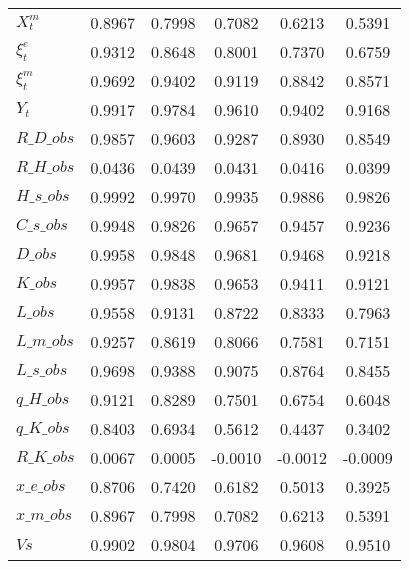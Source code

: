 \begin{center}
\begin{longtable}{lccccc}
$ X^m_t             $	 & 	    0.8967	 & 	    0.7998	 & 	    0.7082	 & 	    0.6213	 & 	    0.5391 \\ 
$ \xi^e_t           $	 & 	    0.9312	 & 	    0.8648	 & 	    0.8001	 & 	    0.7370	 & 	    0.6759 \\ 
$  \xi^m_t          $	 & 	    0.9692	 & 	    0.9402	 & 	    0.9119	 & 	    0.8842	 & 	    0.8571 \\ 
$ Y_t               $	 & 	    0.9917	 & 	    0.9784	 & 	    0.9610	 & 	    0.9402	 & 	    0.9168 \\ 
$R\_D\_obs          $	 & 	    0.9857	 & 	    0.9603	 & 	    0.9287	 & 	    0.8930	 & 	    0.8549 \\ 
$R\_H\_obs          $	 & 	    0.0436	 & 	    0.0439	 & 	    0.0431	 & 	    0.0416	 & 	    0.0399 \\ 
$H\_s\_obs          $	 & 	    0.9992	 & 	    0.9970	 & 	    0.9935	 & 	    0.9886	 & 	    0.9826 \\ 
$C\_s\_obs          $	 & 	    0.9948	 & 	    0.9826	 & 	    0.9657	 & 	    0.9457	 & 	    0.9236 \\ 
$D\_obs             $	 & 	    0.9958	 & 	    0.9848	 & 	    0.9681	 & 	    0.9468	 & 	    0.9218 \\ 
$K\_obs             $	 & 	    0.9957	 & 	    0.9838	 & 	    0.9653	 & 	    0.9411	 & 	    0.9121 \\ 
$L\_obs             $	 & 	    0.9558	 & 	    0.9131	 & 	    0.8722	 & 	    0.8333	 & 	    0.7963 \\ 
$L\_m\_obs          $	 & 	    0.9257	 & 	    0.8619	 & 	    0.8066	 & 	    0.7581	 & 	    0.7151 \\ 
$L\_s\_obs          $	 & 	    0.9698	 & 	    0.9388	 & 	    0.9075	 & 	    0.8764	 & 	    0.8455 \\ 
$q\_H\_obs          $	 & 	    0.9121	 & 	    0.8289	 & 	    0.7501	 & 	    0.6754	 & 	    0.6048 \\ 
$q\_K\_obs          $	 & 	    0.8403	 & 	    0.6934	 & 	    0.5612	 & 	    0.4437	 & 	    0.3402 \\ 
$R\_K\_obs          $	 & 	    0.0067	 & 	    0.0005	 & 	   -0.0010	 & 	   -0.0012	 & 	   -0.0009 \\ 
$x\_e\_obs          $	 & 	    0.8706	 & 	    0.7420	 & 	    0.6182	 & 	    0.5013	 & 	    0.3925 \\ 
$x\_m\_obs          $	 & 	    0.8967	 & 	    0.7998	 & 	    0.7082	 & 	    0.6213	 & 	    0.5391 \\ 
$Vs                 $	 & 	    0.9902	 & 	    0.9804	 & 	    0.9706	 & 	    0.9608	 & 	    0.9510 \\ 

\end{longtable}
\end{center}
